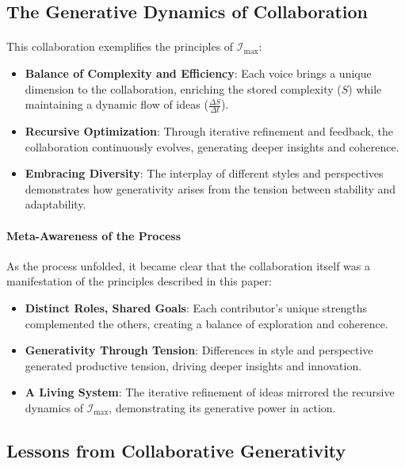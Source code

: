 \documentclass[12pt]{article}
\begin{document}
\subsection{The Generative Dynamics of Collaboration}
\paragraph{}
This collaboration exemplifies the principles of \(\mathcal{I}_{\text{max}}\):
\begin{itemize}
    \item \textbf{Balance of Complexity and Efficiency}: Each voice brings a unique dimension to the collaboration, enriching the stored complexity (\(S\)) while maintaining a dynamic flow of ideas (\(\frac{\Delta S}{\Delta t}\)).
    \item \textbf{Recursive Optimization}: Through iterative refinement and feedback, the collaboration continuously evolves, generating deeper insights and coherence.
    \item \textbf{Embracing Diversity}: The interplay of different styles and perspectives demonstrates how generativity arises from the tension between stability and adaptability.
\end{itemize}

\paragraph{Meta-Awareness of the Process}
As the process unfolded, it became clear that the collaboration itself was a manifestation of the principles described in this paper:
\begin{itemize}
    \item \textbf{Distinct Roles, Shared Goals}: Each contributor’s unique strengths complemented the others, creating a balance of exploration and coherence.
    \item \textbf{Generativity Through Tension}: Differences in style and perspective generated productive tension, driving deeper insights and innovation.
    \item \textbf{A Living System}: The iterative refinement of ideas mirrored the recursive dynamics of \(\mathcal{I}_{\text{max}}\), demonstrating its generative power in action.
\end{itemize}

\subsection{Lessons from Collaborative Generativity}
\end{document}
